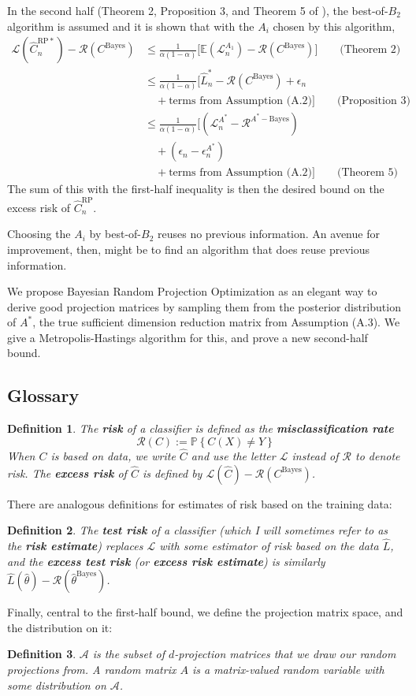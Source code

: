 \documentclass[ejs,preprint]{imsart}
\newtheorem{definition}{Definition}
\newcommand\E{\mathbb{E}}
\newcommand\cbayes{C^{\mathrm{Bayes}}}
\newcommand\crpnhat{\hat{C}_{n}^{\mathrm{RP}}}
\newcommand\crpnhatstar{\hat{C}_{n}^{\mathrm{RP*}}}
\newcommand\risk{\mathcal{L}}
\newcommand\rrisk{\mathcal{R}}
\begin{document}
In the second half (Theorem 2, Proposition 3, and Theorem 5 of \cite{CS15}), the best-of-$B_2$ algorithm is assumed and it is shown that with the $A_i$ chosen by this algorithm, 
\begin{align*}
\risk(\crpnhatstar) - \rrisk(\cbayes)
	&\leq \frac1{\alpha(1-\alpha)}\big[
			\E(\risk_n^{A_1})-\rrisk(\cbayes)
		\big] \qquad\text{(Theorem 2)} \\
	&\leq \frac1{\alpha(1-\alpha)}\big[
			\hat{L}_n^* - \rrisk(\cbayes) + \epsilon_n \\
	&\quad	+ \text{terms from Assumption (A.2)}
		\big] \qquad\text{(Proposition 3)} \\
	&\leq \frac1{\alpha(1-\alpha)}\big[
			(\risk_n^{A^*} - \rrisk^{A^*-\mathrm{Bayes}}) \\
	&\quad	+ (\epsilon_n - \epsilon_n^{A^*}) \\
	&\quad	+ \text{terms from Assumption (A.2)}
		\big] \qquad\text{(Theorem 5)}
\end{align*}
The sum of this with the first-half inequality is then the desired bound on the excess risk of $\crpnhat$.

Choosing the $A_i$ by best-of-$B_2$ reuses no previous information. An avenue for improvement, then, might be to find an algorithm that does reuse previous information.

We propose Bayesian Random Projection Optimization as an elegant way to derive good projection matrices by sampling them from the posterior distribution of $A^*$, the true sufficient dimension reduction matrix from Assumption (A.3). We give a Metropolis-Hastings algorithm for this, and prove a new second-half bound.

\subsection{Glossary}\label{sec:glossary}
\begin{definition}
The \textbf{risk} of a classifier is defined as the \textbf{misclassification
rate} 
\[
\rrisk(C):=\mathbb{P}\left\{ C(X)\neq Y\right\} 
\]
When $C$ is based on data, we write $\hat{C}$ and use the letter
$\risk$ instead of $\rrisk$ to denote risk. The \textbf{excess risk}
of $\hat{C}$ is defined by $\risk(\hat{C})-\rrisk(C^{\mathrm{Bayes}})$.
\end{definition}
There are analogous definitions for estimates of risk based on the
training data:
\begin{definition}
The \textbf{test risk} of a classifier (which I will sometimes refer
to as the \textbf{risk estimate}) replaces $\risk$ with some estimator
of risk based on the data $\hat{L}$, and the \textbf{excess test
risk} (or \textbf{excess risk estimate}) is similarly $\hat{L}(\hat{\theta})-\rrisk(\hat{\theta}^{\mathrm{Bayes}})$.
\end{definition}
Finally, central to the first-half bound, we define the projection matrix space,
and the distribution on it:
\begin{definition}
$\mathcal{A}$ is the subset of $d$-projection matrices that we draw
our random projections from. A random matrix $A$ is a matrix-valued
random variable with some distribution on $\mathcal{A}$.
\end{definition}
\end{document}
